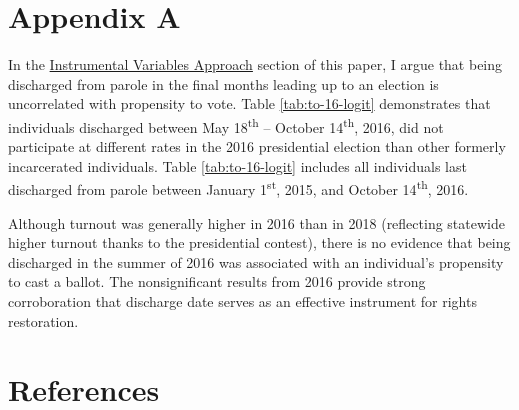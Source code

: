 \documentclass[
  12pt,
]{article}
\begin{document}
\newpage
\setcounter{table}{0}  \renewcommand{\thetable}{A\arabic{table}} \setcounter{figure}{0} \renewcommand{\thefigure}{A\arabic{figure}}

\hypertarget{appendix-a}{%
\section*{Appendix A}\label{appendix-a}}

In the \protect\hyperlink{instrumental-variables-approach}{Instrumental Variables Approach} section of this paper, I argue that being discharged from parole in the final months leading up to an election is uncorrelated with propensity to vote. Table \ref{tab:to-16-logit} demonstrates that individuals discharged between May 18\textsuperscript{th} -- October 14\textsuperscript{th}, 2016, did not participate at different rates in the 2016 presidential election than other formerly incarcerated individuals. Table \ref{tab:to-16-logit} includes all individuals last discharged from parole between January 1\textsuperscript{st}, 2015, and October 14\textsuperscript{th}, 2016.



Although turnout was generally higher in 2016 than in 2018 (reflecting statewide higher turnout thanks to the presidential contest), there is no evidence that being discharged in the summer of 2016 was associated with an individual's propensity to cast a ballot. The nonsignificant results from 2016 provide strong corroboration that discharge date serves as an effective instrument for rights restoration.

\newpage

\hypertarget{references}{%
\section*{References}\label{references}}
\end{document}
